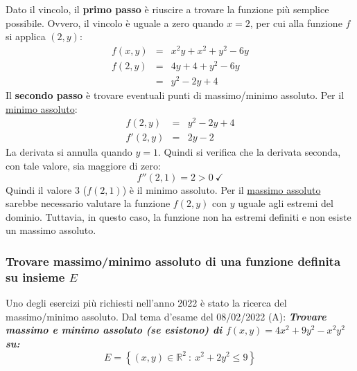 \documentclass[a4paper]{article}
\begin{document}
	\noindent
	Dato il vincolo, il \textbf{primo passo} è riuscire a trovare la funzione più semplice possibile. Ovvero, il vincolo è uguale a zero quando $x = 2$, per cui alla funzione $f$ si applica $\left(2,y\right)$:
	\begin{equation*}
		\begin{array}{rcl}
			f\left(x,y\right) &=& x^{2}y + x^{2} + y^{2} - 6y \\ [.5em]
			f\left(2,y\right) &=& 4y + 4 + y^{2} - 6y \\ [.5em]
			&=& y^{2} -2y + 4
		\end{array}
	\end{equation*}
	Il \textbf{secondo passo} è trovare eventuali punti di massimo/minimo assoluto. Per il \underline{minimo assoluto}:
	\begin{equation*}
		\begin{array}{rcl}
			f\left(2,y\right) &=& y^{2} -2y + 4 \\ [.5em]
			f'\left(2,y\right)&=& 2y - 2
		\end{array}
	\end{equation*}
	La derivata si annulla quando $y = 1$. Quindi si verifica che la derivata seconda, con tale valore, sia maggiore di zero:
	\begin{equation*}
		f''\left(2,1\right) = 2 > 0 \: \checkmark
	\end{equation*}
	Quindi il valore $3$ ($f\left(2,1\right)$) è il minimo assoluto. Per il \underline{massimo assoluto} sarebbe necessario valutare la funzione $f\left(2,y\right)$ con $y$ uguale agli estremi del dominio. Tuttavia, in questo caso, la funzione non ha estremi definiti e non esiste un massimo assoluto.\newpage

	\subsubsection{Trovare massimo/minimo assoluto di una funzione definita su insieme $E$}\label{par: trovare massimo/minimo assoluto di una funzione definita su insieme E}

	Uno degli esercizi più richiesti nell'anno 2022 è stato la ricerca del massimo/minimo assoluto. Dal tema d'esame del 08/02/2022 (A): \textcolor{Green4}{\textbf{\emph{Trovare massimo e minimo assoluto (se esistono) di $f\left(x,y\right) = 4x^{2} + 9y^{2} - x^{2}y^{2}$ su:}}
	\begin{equation*}
		E = \left\{\left(x,y\right) \in \mathbb{R}^{2} \: : \: x^{2} + 2y^{2} \le 9\right\}
	\end{equation*}}\newline
\end{document}
